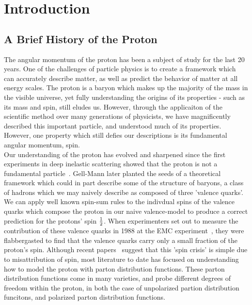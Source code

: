 \chapter{Introduction}

\section{A Brief History of the Proton}
The angular momentum of the proton has been a subject of study for the last 20
years\needcite{}. One of the challenges of particle physics is to create a
framework which can accurately describe matter, as well as predict the behavior
of matter at all energy scales. The proton is a baryon which makes up the
majority of the mass in the visible universe, yet fully understanding the
origins of its properties - such as its mass and spin, still eludes us. However,
through the applicaiton of the scientific method over many generations of
physicists, we have magnificently described this important particle, and
understood much of its properties. However, one property which still defies our
descriptions is its fundamental angular momentum, spin. \\
	
Our understanding of the proton has evolved and sharpened since the first
experiments in deep inelastic scattering showed that the proton is not a
fundamental particle~\cite{PhysRevLett.23.930}. Gell-Mann later planted the
seeds of a theoretical framework which could in part describe some of the
structure of baryons, a class of hadrons which we may naively describe as
composed of three 'valence quarks'\needcite{}. We can apply well known spin-sum
rules to the indivdual spins of the valence quarks which compose the proton in
our naive valence-model to produce a correct prediction for the protons' spin
${1}\over{2}$. When experimenters set out to measure the contribution of these
valence quarks in 1988 at the EMC experiment~\cite{1988PhLB..206..364A}, they
were flabbergasted to find that the valence quarks carry only a small fraction
of the proton's spin. Although recent papers~\cite{1603.05884} suggest that this 'spin
crisis' is simple due to misattribution of spin, most literature to date has
focused on understanding how to model the proton with parton distribution
functions. These parton distribution functions come in many varieties, and probe
different degrees of freedom within the proton, in both the case of unpolarized
partion distribution funcitons, and polarized parton distribution functions. \\
 
